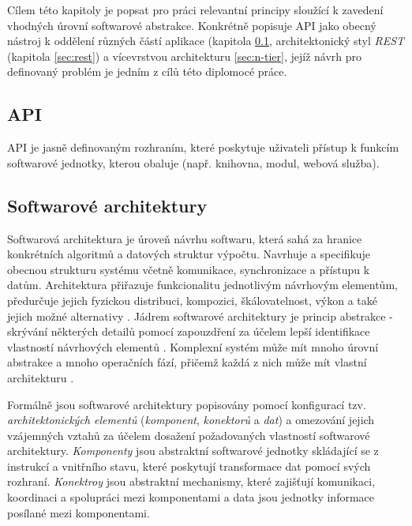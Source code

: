 Cílem této kapitoly je popsat pro práci relevantní principy sloužící k zavedení vhodných úrovní softwarové abstrakce. Konkrétně popisuje API jako obecný nástroj k oddělení různých částí aplikace (kapitola \ref{sec:api}, architektonický styl \textit{REST} (kapitola \ref{sec:rest}) a vícevrstvou architekturu \ref{sec:n-tier}, jejíž návrh pro definovaný problém je jedním z cílů této diplomocé práce.     

\subsection{API}
\label{sec:api}
API je jasně definovaným rozhraním, které poskytuje uživateli přístup k funkcím softwarové jednotky, kterou obaluje (např. knihovna, modul, webová služba). 





\subsection{Softwarové architektury}
\label{sec:architectures}
Softwarová architektura je úroveň návrhu softwaru, která sahá za hranice konkrétních algoritmů a datových struktur výpočtu. Navrhuje a specifikuje obecnou strukturu systému včetně komunikace, 
synchronizace a přístupu k datům. Architektura přiřazuje funkcionalitu jednotlivým návrhovým elementům, předurčuje jejich fyzickou distribuci, kompozici, škálovatelnost, výkon a také jejich možné alternativy \cite{Garlan94}. Jádrem softwarové architektury je princip abstrakce - skrývání některých detailů pomocí zapouzdření za účelem lepší identifikace vlastností návrhových elementů \cite{Shaw90}. Komplexní systém může mít mnoho úrovní abstrakce a mnoho operačních fází, přičemž každá z nich může mít vlastní architekturu \cite{Bass98}. 

Formálně jsou softwarové architektury popisovány pomocí konfigurací tzv. \textit{architektonických elementů} (\textit{komponent}, \textit{konektorů} a \textit{dat}) a omezování jejich vzájemných vztahů za účelem dosažení požadovaných vlastností softwarové architektury. \textit{Komponenty} jsou abstraktní softwarové jednotky skládající se z instrukcí a vnitřního stavu, které poskytují transformace dat pomocí svých rozhraní. \textit{Konektroy} jsou abstraktní mechanismy, které zajišťují komunikaci, koordinaci a spolupráci mezi komponentami a data jsou jednotky informace posílané mezi komponentami. \cite{Shaw97} 

